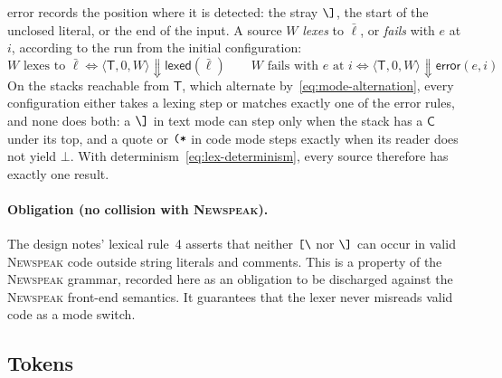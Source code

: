 \documentclass[11pt]{article}
\numberwithin{equation}{section}
\newcommand{\NS}{\textsc{Newspeak}}
\newcommand{\kw}[1]{\ensuremath{\mathsf{#1}}}
\newcommand{\str}[1]{\ensuremath{\text{\texttt{#1}}}}
\newcommand{\bs}{\textbackslash}
\newcommand{\Open}{\str{[\bs}}
\newcommand{\Close}{\str{\bs]}}
\newcommand{\TM}{\kw{T}}
\newcommand{\CM}{\kw{C}}
\begin{document}
error records the position where it is detected: the stray $\Close$, the
start of the unclosed literal, or the end of the input.  A
source $W$ \emph{lexes} to $\bar\ell$, or \emph{fails} with $e$ at $i$, according
to the run from the initial configuration:
\begin{equation}\label{eq:lex-source}
W \text{ lexes to } \bar\ell \iff
  \langle \TM, 0, W \rangle \Downarrow \kw{lexed}(\bar\ell)
\qquad
W \text{ fails with } e \text{ at } i \iff
  \langle \TM, 0, W \rangle \Downarrow \kw{error}(e, i)
\end{equation}
On the stacks reachable from $\TM$, which alternate
by~\eqref{eq:mode-alternation}, every configuration either takes a lexing
step or matches exactly one of the error rules, and none does both: a
$\Close$ in text mode can step only when the stack has a $\CM$ under its
top, and a quote or $\str{(*}$ in code mode steps exactly when its reader
does not yield $\bot$.  With determinism~\eqref{eq:lex-determinism}, every
source therefore has exactly one result.

\paragraph{Obligation (no collision with \NS).}
The design notes' lexical rule~4 asserts that neither $\Open$ nor $\Close$
can occur in valid \NS{} code outside string literals and comments.  This is
a property of the \NS{} grammar, recorded here as an obligation to be
discharged against the \NS{} front-end semantics.  It guarantees that the
lexer never misreads valid code as a mode switch.

\subsection{Tokens}
\end{document}
